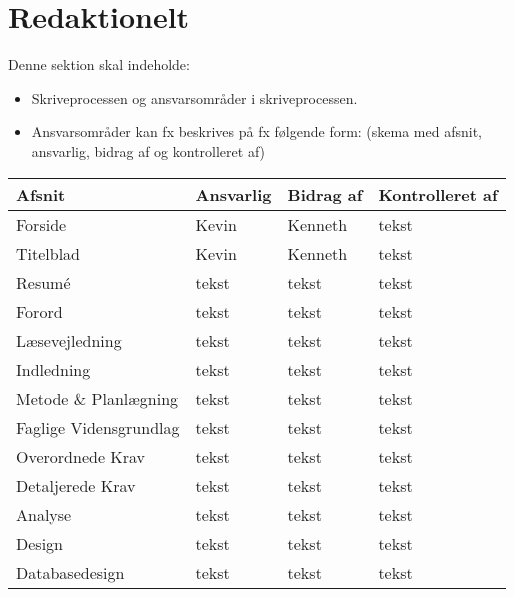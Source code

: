 \section{Redaktionelt}
Denne sektion skal indeholde:

\begin{itemize}
    \item Skriveprocessen og ansvarsområder i skriveprocessen.
    \item Ansvarsområder kan fx beskrives på fx følgende form: (skema med afsnit, ansvarlig, bidrag af og kontrolleret af)
\end{itemize}{}

\begin{table}[H] %
    \begin{tabularx}{\textwidth}{|p{7cm}|X|X|X|}
        \hline
        \textbf{Afsnit}                     &  \textbf{Ansvarlig}  & \textbf{Bidrag af} & \textbf{Kontrolleret af}\\
        \hline
        Forside                             & Kevin & Kenneth & tekst \\
        \hline
        Titelblad                           & Kevin & Kenneth & tekst \\
        \hline
        Resumé                              & tekst & tekst & tekst \\
        \hline
        Forord                              & tekst & tekst & tekst \\
        \hline
        Læsevejledning                      & tekst & tekst & tekst \\
        \hline
        Indledning                          & tekst & tekst & tekst \\
        \hline
        Metode \& Planlægning               & tekst & tekst & tekst \\
        \hline
        Faglige Vidensgrundlag              & tekst & tekst & tekst \\
        \hline
        Overordnede Krav                    & tekst & tekst & tekst \\
        \hline
        Detaljerede Krav                    & tekst & tekst & tekst \\
        \hline
        Analyse                             & tekst & tekst & tekst \\
        \hline
        Design                              & tekst & tekst & tekst \\
        \hline
        Databasedesign                      & tekst & tekst & tekst \\

\end{tabularx}
\end{table}
